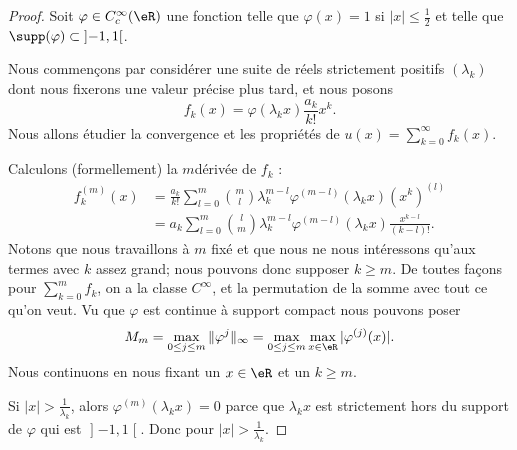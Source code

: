 \begin{proof}
    Soit \( \varphi\in C^{\infty}_c(\eR)\) une fonction telle que \( \varphi(x)=1\) si \( | x |\leq \frac{ 1 }{2}\) et telle que \( \supp(\varphi)\subset\mathopen] -1 , 1 \mathclose[\).

    Nous commençons par considérer une suite de réels strictement positifs \( (\lambda_k)\) dont nous fixerons une valeur précise plus tard, et nous posons
    \begin{equation}
        f_k(x)=\varphi(\lambda_k x)\frac{ a_k }{ k! }x^k.
    \end{equation}
    Nous allons étudier la convergence et les propriétés de \( u(x)=\sum_{k=0}^{\infty}f_k(x)\). 

    Calculons (formellement) la \( m\)\ieme dérivée de \( f_k\) :
    \begin{subequations}
        \begin{align}
            f_k^{(m)}(x)&=\frac{ a_k }{ k! }\sum_{l=0}^{m}\binom{ m }{ l }\lambda_k^{m-l}\varphi^{(m-l)}(\lambda_kx)(x^k)^{(l)}\\
            &=a_k\sum_{l=0}^{m}\binom{ l }{ m }\lambda_k^{m-l}\varphi^{(m-l)}(\lambda_kx)\frac{ x^{k-l} }{ (k-l)! }.
        \end{align}
    \end{subequations}
    Notons que nous travaillons à \( m\) fixé et que nous ne nous intéressons qu'aux termes avec \( k\) assez grand; nous pouvons donc supposer \( k\geq m\). De toutes façons pour \( \sum_{k=0}^mf_k\), on a la classe \(  C^{\infty}\), et la permutation de la somme avec tout ce qu'on veut. Vu que \( \varphi\) est continue à support compact nous pouvons poser
    \begin{equation}
        M_m=\max_{0\leq j\leq m}\| \varphi^{j} \|_{\infty}=\max_{0\leq j\leq m}\max_{x\in \eR}| \varphi^{(j)}(x) |.
    \end{equation}
    Nous continuons en nous fixant un \( x\in \eR\) et un \( k\geq m\).

    Si \( | x |>\frac{1}{ \lambda_k }\), alors \( \varphi^{(m)}(\lambda_kx)=0\) parce que \( \lambda_kx\) est strictement hors du support de \( \varphi\) qui est \( \mathopen] -1 , 1 \mathclose[\). Donc pour \( | x |>\frac{1}{ \lambda_k }\).


\end{proof}
